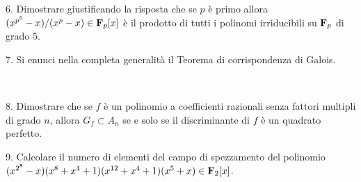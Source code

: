 \item{6.} Dimostrare giustificando la risposta che se $p$ \`{e} primo allora $(x^{p^5}-x)/(x^p-x)\in{\bf F}_p[x]$ \`{e} il prodotto di tutti
i polinomi irriducibili su ${\bf F}_p$ di grado $5$.

\vv \item{7.} Si enunci nella completa generalit\`a il Teorema di
corrispondenza di Galois.

\ve\ \vs


\item{8.} Dimostrare che se $f$ \`{e} un polinomio a coefficienti razionali senza fattori multipli di grado $n$,
allora $G_f\subset A_n$ se e solo se il discriminante di $f$ \`{e} un quadrato perfetto.

\vv

\item{9.} Calcolare il numero di elementi del campo di spezzamento del polinomio $(x^{2^8}-x)(x^8+x^4+1)(x^{12}+x^4+1)(x^5+x)\in{\bf F}_2[x]$.

\ \vst
 \bye
